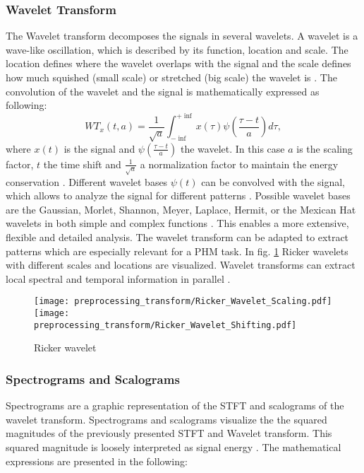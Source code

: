 \subsubsection{Wavelet Transform}
The Wavelet transform decomposes the signals in several wavelets. A wavelet is a wave-like oscillation, which is described by its function, location and scale. The location defines where the wavelet overlaps with the signal and the scale defines how much squished (small scale) or stretched (big scale) the wavelet is \cite{Sifuzzaman2009}. The convolution of the wavelet and the signal is mathematically expressed as following:
\begin{equation}
    WT_{x}(t,a) = \frac{1}{\sqrt{a}} \int_{- \inf}^{+ \inf} x(\tau) \psi(\frac{\tau -t}{a}) d \tau,
\end{equation}
 where $x(t)$ is the signal and $\psi(\frac{\tau -t}{a})$ the wavelet. In this case $a$ is the scaling factor, $t$ the time shift and $\frac{1}{\sqrt{a}}$ a normalization factor to maintain the energy conservation \cite{FENG2013}. Different wavelet bases $\psi(t)$ can be convolved with the signal, which allows to analyze the signal for different patterns \cite{Sifuzzaman2009}. Possible wavelet bases are the Gaussian, Morlet, Shannon, Meyer, Laplace, Hermit, or the Mexican Hat wavelets in both simple and complex functions \cite{Verstraete2017}. This enables a more extensive, flexible and detailed analysis. The wavelet transform can be adapted to extract patterns which are especially relevant for a PHM task. In fig. \ref{fig:ricker_wavelet} Ricker wavelets with different scales and locations are visualized. Wavelet transforms can extract local spectral and temporal information in parallel \cite{Sifuzzaman2009}.


\begin{figure}[H]
  \centering
  \texttt{[image: preprocessing\_transform/Ricker\_Wavelet\_Scaling.pdf]}
  \hspace{.1cm}
  \texttt{[image: preprocessing\_transform/Ricker\_Wavelet\_Shifting.pdf]}
  

  \caption{Ricker wavelet}
  \label{fig:ricker_wavelet}
\end{figure}

\subsubsection{Spectrograms and Scalograms}

 Spectrograms are a graphic representation of the STFT and scalograms of the wavelet transform. Spectrograms and scalograms visualize the the squared magnitudes of the previously presented STFT and Wavelet transform. This squared magnitude is loosely interpreted as signal energy \cite{Hlawatsch1992}. The mathematical expressions are presented in the following: 

